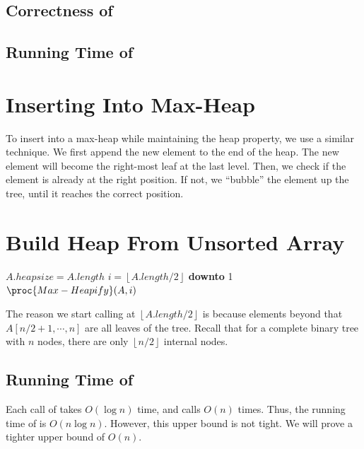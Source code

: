 \subsection{Correctness of }

\subsection{Running Time of }

\section{Inserting Into Max-Heap}

To insert into a max-heap while maintaining the heap property, we use a similar technique. We first append the new element to the end of the heap. The new element will become the right-most leaf at the last level. Then, we check if the element is already at the right position. If not, we ``bubble'' the element up the tree, until it reaches the correct position.

\section{Build Heap From Unsorted Array}

\begin{codebox}
    \li $A.heapsize = A.length$
    \li \For $i = \left\lfloor A.length / 2 \right\rfloor$ \textbf{downto} 1
    \li \Then $\proc{Max-Heapify}(A,i)$
    \End
\end{codebox}


The reason we start calling  at $\left\lfloor A.length / 2 \right\rfloor$ is because elements beyond that $A[n / 2+1, \cdots, n]$ are all leaves of the tree. Recall that for a complete binary tree with $n$ nodes, there are only $\left\lfloor n / 2 \right\rfloor$ internal nodes.

\subsection{Running Time of }

Each call of  takes $O(\log n)$ time, and  calls  $O(n)$ times. Thus, the running time of  is $O(n \log n)$. However, this upper bound is not tight. We will prove a tighter upper bound of $O(n)$.


